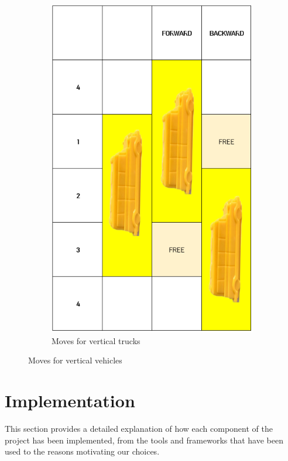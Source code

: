 \documentclass{article}
\begin{document}
\begin{figure}[H]
\begin{subfigure}{.5\textwidth}
      \includegraphics[width=0.83\linewidth]{images/truck_ver.png}
      \caption{Moves for vertical trucks}
    \end{subfigure}
    \caption{Moves for vertical vehicles}
    \label{fig:vertical}
\end{figure}


\section{Implementation}
\noindent This section provides a detailed explanation of how each component of the project has been implemented, from the tools and frameworks that have been used to the reasons motivating our choices.
\end{document}
